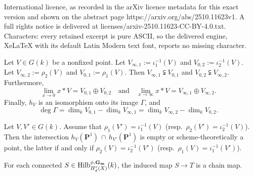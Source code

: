 \documentclass[10pt,a4paper]{amsart}
\def\IP{{\mathbf P}}
\def\cc{{\mathbf G}_{\mathbf m}}
\begin{document}
International licence, as recorded in the arXiv licence metadata for this exact version and shown on the abstract page https://arxiv.org/abs/2510.11623v1. A full rights notice is delivered at licenses/arxiv-2510.11623-CC-BY-4.0.txt. Characters: every retained excerpt is pure ASCII, so the delivered engine, XeLaTeX with its default Latin Modern text font, reports no missing character.
\begin{prop}\label{hV} Let $V\in G(k)$ be a nonfixed point. 
Let $V_{\infty,1}:=\iota_1^{-1}(V)$ and 
$V_{0,2}:=\iota_2^{-1}(V)$. Let 
$V_{\infty,2}:=\rho_2(V)$ and $V_{0,1}:=\rho_1(V)$. Then $V_{\infty,1}\subsetneqq V_{0,1}$ and $V_{0,2}\subsetneqq V_{\infty,2}$. Furthermore,
\begin{equation}\label{limlim}
\lim_{x\to 0}x*V=V_{0,1}\oplus V_{0,2}\quad \text{and} \quad
\lim_{x\to \infty}x*V=V_{\infty,1}\oplus V_{\infty,2}.
\end{equation}
Finally, $h_V$ is an isomorphism onto its image $\Gamma$, and
$$
\deg \Gamma=
\dim_k V_{0,1}-\dim_k V_{\infty,1}=
\dim_k V_{\infty,2}-\dim_k V_{0,2}.
$$
\end{prop}

\begin{prop} \label{hVV} Let $V,V'\in G(k)$. Assume that $\rho_1(V')=\iota^{-1}_1(V)$ (resp.~$\rho_2(V')=\iota_2^{-1}(V)$). Then the intersection $h_{V}(\IP^1)\,\cap\,h_{V'}(\IP^1)$ is empty or scheme-theoretically a point, the latter if and only if $\rho_2(V)=\iota_2^{-1}(V')$ (resp.~$\rho_1(V)=\iota_1^{-1}(V')$).
\end{prop}

\begin{thm}\label{chainmaps} For each connected $S\in \text{\rm Hilb}^{\phi,\cc}_{H^r_d(X)}(k)$, the induced map $S\to T$ is a chain map.
\end{thm}
\end{document}
